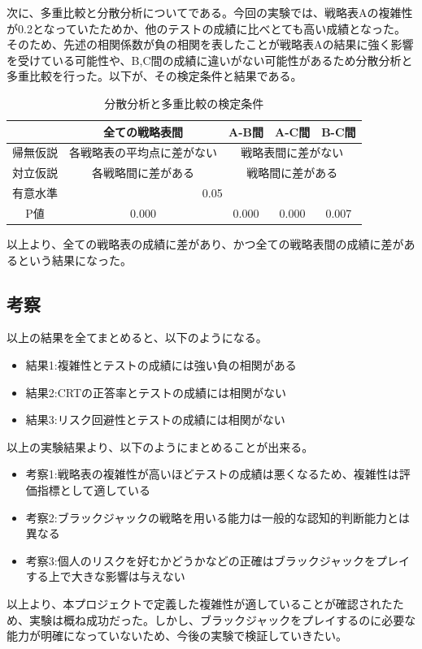次に、多重比較と分散分析についてである。今回の実験では、戦略表Aの複雑性が0.2となっていたためか、他のテストの成績に比べとても高い成績となった。そのため、先述の相関係数が負の相関を表したことが戦略表Aの結果に強く影響を受けている可能性や、B,C間の成績に違いがない可能性があるため分散分析と多重比較を行った。以下が、その検定条件と結果である。
\begin{table}[H]
    \begin{center}
        \caption{分散分析と多重比較の検定条件}
        \begin{tabular}{|c|c|c|c|c|}
        \hline
            & 全ての戦略表間       & A-B間     & A-C間     & B-C間     \\ \hline
        帰無仮説 & 各戦略表の平均点に差がない & \multicolumn{3}{c|}{戦略表間に差がない} \\ \hline
        対立仮説 & 各戦略間に差がある     & \multicolumn{3}{c|}{戦略間に差がある}  \\ \hline
        有意水準 & \multicolumn{4}{c|}{0.05}                      \\ \hline
        P値   & 0.000         & 0.000    & 0.000    & 0.007    \\ \hline
        \end{tabular}
    \end{center}
\end{table}
以上より、全ての戦略表の成績に差があり、かつ全ての戦略表間の成績に差があるという結果になった。

\subsection{考察}

以上の結果を全てまとめると、以下のようになる。
\begin{itemize}
    \item 結果1:複雑性とテストの成績には強い負の相関がある
    \item 結果2:CRTの正答率とテストの成績には相関がない
    \item 結果3:リスク回避性とテストの成績には相関がない
\end{itemize}
以上の実験結果より、以下のようにまとめることが出来る。
\begin{itemize}
    \item 考察1:戦略表の複雑性が高いほどテストの成績は悪くなるため、複雑性は評価指標として適している
    \item 考察2:ブラックジャックの戦略を用いる能力は一般的な認知的判断能力とは異なる
    \item 考察3:個人のリスクを好むかどうかなどの正確はブラックジャックをプレイする上で大きな影響は与えない
\end{itemize}
以上より、本プロジェクトで定義した複雑性が適していることが確認されたため、実験は概ね成功だった。しかし、ブラックジャックをプレイするのに必要な能力が明確になっていないため、今後の実験で検証していきたい。
